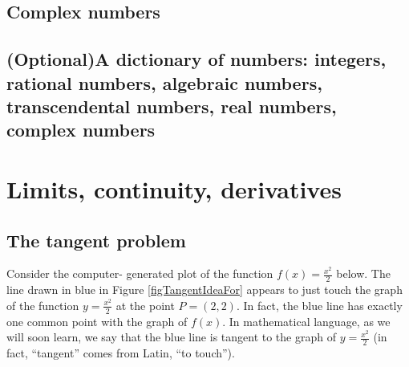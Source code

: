 \documentclass[12pt]{book}
\newcommand{\optionalMaterial}{\textbf{(Optional)}}
\begin{document}
\section{ Complex numbers}
\section{\optionalMaterial A dictionary of numbers: integers, rational numbers, algebraic numbers, transcendental numbers, real numbers, complex numbers}

\chapter{Limits, continuity, derivatives}
\section{The tangent problem}
Consider the computer- generated plot of the function $f(x)=\frac{x^2}2$ below. The line drawn in blue in Figure \ref{figTangentIdeaFor} appears to just touch the graph of the function $y=\frac{x^2}2$ at the point $P=(2,2)$. In fact, the blue line has exactly one common point with the graph of $f(x)$. In mathematical language, as we will soon learn, we say that the blue line is tangent to the graph of $ y=\frac{x^2}2$ (in fact, ``tangent'' comes from Latin, ``to touch''). 
\end{document}

